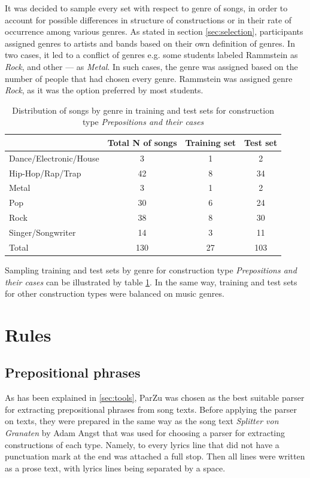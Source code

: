 It was decided to sample every set with respect to genre of songs, in order to account for possible differences in structure of constructions or in their rate of occurrence among various genres. As stated in section \ref{sec:selection}, participants assigned genres to artists and bands based on their own definition of genres. In two cases, it led to a conflict of genres e.g. some students labeled Rammstein as \textit{Rock}, and other --- as \textit{Metal}. In such cases, the genre was assigned based on the number of people that had chosen every genre. Rammstein was assigned genre \textit{Rock}, as it was the option preferred by most students.

\begin{table}[h!]
    \centering
    \begin{tabular}{l|c|c|c}
        & Total N of songs & Training set & Test set \\
        \hline
        Dance/Electronic/House & 3 & 1 & 2 \\
        Hip-Hop/Rap/Trap & 42 & 8 & 34 \\
        Metal & 3 & 1 & 2 \\
        Pop & 30 & 6 & 24 \\
        Rock & 38 & 8 & 30 \\
        Singer/Songwriter & 14 & 3 & 11 \\
        \hline
        Total & 130 & 27 & 103 \\
        \hline
    \end{tabular}
    \caption{Distribution of songs by genre in training and test sets for construction type \textit{Prepositions and their cases}}
    \label{table:genre-distribution}
\end{table}

Sampling training and test sets by genre for construction type \textit{Prepositions and their cases }can be illustrated by table \ref{table:genre-distribution}. In the same way, training and test sets for other construction types were balanced on music genres.

\section{Rules}

\subsection{Prepositional phrases}

As has been explained in \ref{sec:tools}, ParZu was chosen as the best suitable parser for extracting prepositional phrases from song texts. Before applying the parser on texts, they were prepared in the same way as the song text \textit{Splitter von Granaten} by Adam Angst that was used for choosing a parser for extracting constructions of each type. Namely, to every lyrics line that did not have a punctuation mark at the end was attached a full stop. Then all lines were written as a prose text, with lyrics lines being separated by a space. 

